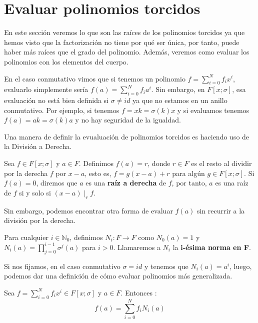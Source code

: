 \section{Evaluar polinomios torcidos}

En este sección veremos lo que son las raíces de los polinomios torcidos ya que hemos visto que la factorización no tiene por qué ser única, por tanto, puede haber más raíces que el grado del polinomio. Además, veremos como evaluar los polinomios con los elementos del cuerpo.

En el caso conmutativo vimos que si tenemos un polinomio $f = \sum_{i=0}^N f_ix^i$, evaluarlo simplemente sería $f(a) = \sum_{i=0}^N f_ia^i$. Sin embargo, en $F[x;\sigma]$, esa evaluación no está bien definida si $\sigma \neq id$ ya que no estamos en un anillo conmutativo. Por ejemplo, si tenemos $f=xk = \sigma(k)x$ y si evaluamos tenemos $f(a) = ak = \sigma(k)a$ y no hay seguridad de la igualdad.

Una manera de definir la evualuación de polinomios torcidos es haciendo uso de la División a Derecha.

\begin{definition}
    Sea $f \in F[x;\sigma]$ y $ a \in F$. Definimos $f(a) = r$, donde $r \in F$ es el resto al dividir por la derecha $f$ por $x-a$, esto es, $f = g(x-a) + r$ para algún $g \in F[x;\sigma]$. Si $f(a) = 0$, diremos que $a$ es una \textbf{raíz a derecha} de $f$, por tanto, $a$ es una raíz de $f$ si y solo si $(x-a) \mid_r f$.
    \end{definition}

Sin embargo, podemos encontrar otra forma de evaluar $f(a)$ sin recurrir a la división por la derecha.

\begin{definition}
    Para cualquier $i \in \mathbb{N}_0$, definimos $N_i : F \rightarrow F$ como $N_0(a) = 1$ y $N_i(a) = \prod_{j=0}^{i-1}\sigma^j(a)$ para $i > 0$. Llamaremos a $N_i$ la \textbf{i-ésima norma en F}.
\end{definition}

Si nos fijamos, en el caso conmutativo $\sigma = id$ y tenemos que $N_i(a) = a^i$, luego, podemos dar una definición de cómo evaluar polinomios más generalizada.

\begin{proposition}
\label{pro: evaluar polinomios}
Sea $f = \sum_{i=0}^N f_ix^i \in F[x;\sigma]$ y $a \in F$. Entonces :
\[ f(a) = \sum_{i=0}^N f_iN_i(a)\]
\end{proposition}

